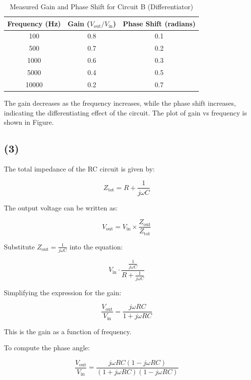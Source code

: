 \documentclass{article}
\begin{document}
\begin{table}[H]
\centering
\caption{Measured Gain and Phase Shift for Circuit B (Differentiator)}
\begin{tabular}{|c|c|c|}
\hline
Frequency (Hz) & Gain ($V_{\text{out}}/V_{\text{in}}$) & Phase Shift (radians) \\ \hline
100            & 0.8                & 0.1               \\ \hline
500            & 0.7                & 0.2               \\ \hline
1000           & 0.6                & 0.3               \\ \hline
5000           & 0.4                & 0.5               \\ \hline
10000          & 0.2                & 0.7               \\ \hline
\end{tabular}
\end{table}

The gain decreases as the frequency increases, while the phase shift increases, 
indicating the differentiating effect of the circuit. The plot of gain vs frequency 
is shown in Figure.


\subsection{(3) }

The total impedance of the RC circuit is given by:

\[
Z_{\text{tot}} = R + \frac{1}{j \omega C}
\]

The output voltage can be written as:

\[
V_{\text{out}} = V_{\text{in}} \times \frac{Z_{\text{out}}}{Z_{\text{tot}}}
\]

Substitute \( Z_{\text{out}} = \frac{1}{j \omega C} \) into the equation:

\[
V_{\text{in}} \cdot \frac{\frac{1}{j \omega C}}{R + \frac{1}{j \omega C}}
\]

Simplifying the expression for the gain:

\[
\frac{V_{\text{out}}}{V_{\text{in}}} = \frac{j \omega RC}{1 + j \omega RC}
\]

This is the gain as a function of frequency.

To compute the phase angle:

\[
\frac{V_{\text{out}}}{V_{\text{in}}} = \frac{j \omega RC(1 - j \omega RC)}{(1 + j \omega RC)(1 - j \omega RC)}
\]
\end{document}
